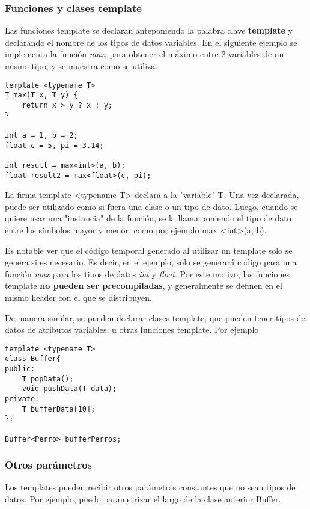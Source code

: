 \documentclass[a4paper, twoside]{article}
\begin{document}
\subsubsection{Funciones y clases template}
Las funciones template se declaran anteponiendo la palabra clave \textbf{template} y declarando el nombre de los tipos de datos variables. En el siguiente ejemplo se implementa la función \emph{max}, para obtener el máximo entre 2 variables de un mismo tipo, y se muestra como se utiliza.

\begin{lstlisting}
template <typename T>
T max(T x, T y) {
    return x > y ? x : y;
}

int a = 1, b = 2;
float c = 5, pi = 3.14;

int result = max<int>(a, b);
float result2 = max<float>(c, pi);
\end{lstlisting}

La firma template <typename T> declara a la "variable" T. Una vez declarada, puede ser utilizado como si fuera una clase o un tipo de dato. Luego, cuando se quiere usar una "instancia" de la función, se la llama poniendo el tipo de dato entre los símbolos mayor y menor, como por ejemplo max <int>(a, b). 

Es notable ver que el código temporal generado al utilizar un template solo se genera si es necesario. Es decir, en el ejemplo, solo se generará codigo para una función \emph{max} para los tipos de datos \emph{int} y \emph{float}. Por este motivo, las funciones template \textbf{no pueden ser precompiladas}, y generalmente se definen en el mismo header con el que se distribuyen.

De manera similar, se pueden declarar clases template, que pueden tener tipos de datos de atributos variables, u otras funciones template. Por ejemplo

\begin{lstlisting}
template <typename T>
class Buffer{
public:
	T popData();
	void pushData(T data);
private:
	T bufferData[10];
};

Buffer<Perro> bufferPerros;
\end{lstlisting}

\subsubsection{Otros parámetros}
Los templates pueden recibir otros parámetros constantes que no sean tipos de datos. Por ejemplo, puedo parametrizar el largo de la clase anterior Buffer.
\end{document}
